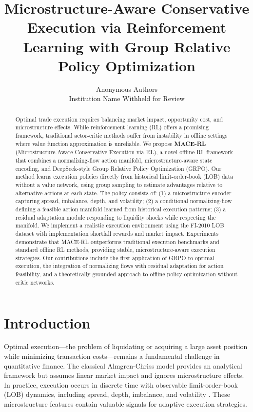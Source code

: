 \documentclass{article}
\title{Microstructure-Aware Conservative Execution via Reinforcement Learning with Group Relative Policy Optimization}
\author{
    Anonymous Authors \\
    Institution Name Withheld for Review
}
\begin{document}
\maketitle

\begin{abstract}
Optimal trade execution requires balancing market impact, opportunity cost, and microstructure effects. While reinforcement learning (RL) offers a promising framework, traditional actor-critic methods suffer from instability in offline settings where value function approximation is unreliable. We propose \textbf{MACE-RL} (Microstructure-Aware Conservative Execution via RL), a novel offline RL framework that combines a normalizing-flow action manifold, microstructure-aware state encoding, and DeepSeek-style Group Relative Policy Optimization (GRPO). Our method learns execution policies directly from historical limit-order-book (LOB) data without a value network, using group sampling to estimate advantages relative to alternative actions at each state. The policy consists of: (1) a microstructure encoder capturing spread, imbalance, depth, and volatility; (2) a conditional normalizing-flow defining a feasible action manifold learned from historical execution patterns; (3) a residual adaptation module responding to liquidity shocks while respecting the manifold. We implement a realistic execution environment using the FI-2010 LOB dataset with implementation shortfall rewards and market impact. Experiments demonstrate that MACE-RL outperforms traditional execution benchmarks and standard offline RL methods, providing stable, microstructure-aware execution strategies. Our contributions include the first application of GRPO to optimal execution, the integration of normalizing flows with residual adaptation for action feasibility, and a theoretically grounded approach to offline policy optimization without critic networks.
\end{abstract}

\section{Introduction}
Optimal execution—the problem of liquidating or acquiring a large asset position while minimizing transaction costs—remains a fundamental challenge in quantitative finance. The classical Almgren-Chriss model \citep{almgren2001optimal} provides an analytical framework but assumes linear market impact and ignores microstructure effects. In practice, execution occurs in discrete time with observable limit-order-book (LOB) dynamics, including spread, depth, imbalance, and volatility \citep{gould2013limit}. These microstructure features contain valuable signals for adaptive execution strategies.
\end{document}
